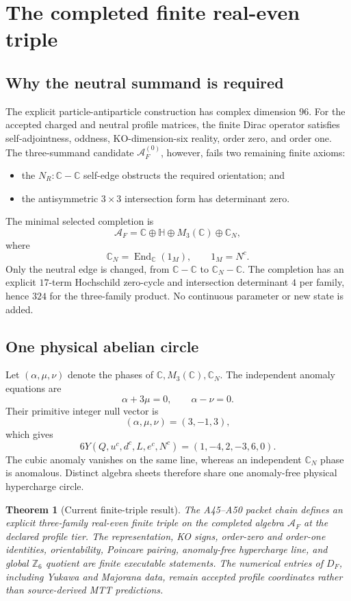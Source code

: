 \documentclass[11pt,a4paper,twoside]{article}
\theoremstyle{plain}
\newtheorem{theorem}{Theorem}[section]
\theoremstyle{definition}
\theoremstyle{remark}
\newcommand{\CC}{\mathbb{C}}
\newcommand{\HH}{\mathbb{H}}
\newcommand{\AF}{\mathcal{A}_{F}}
\newcommand{\DF}{D_{F}}
\newcommand{\CN}{\mathbb{C}_{N}}
\begin{document}
\section{The completed finite real-even triple}

\subsection{Why the neutral summand is required}

The explicit particle-antiparticle construction has complex dimension $96$.
For the accepted charged and neutral profile matrices, the finite Dirac
operator satisfies self-adjointness, oddness, KO-dimension-six reality,
order zero, and order one.  The three-summand candidate
$\AF^{(0)}$, however, fails two remaining finite axioms:
\begin{itemize}
\item the $N_R:\CC\!-\!\CC$ self-edge obstructs the required orientation; and
\item the antisymmetric $3\times3$ intersection form has determinant zero.
\end{itemize}

The minimal selected completion is
\[
 \AF=\CC\oplus\HH\oplus M_3(\CC)\oplus\CN,
\]
where
\[
 \CN=\operatorname{End}_{\CC}(1_M),\qquad 1_M=N^c.
\]
Only the neutral edge is changed, from $\CC\!-\!\CC$ to
$\CN\!-\!\CC$.  The completion has an explicit $17$-term Hochschild
zero-cycle and intersection determinant $4$ per family, hence $324$ for the
three-family product.  No continuous parameter or new state is added.

\subsection{One physical abelian circle}

Let $(\alpha,\mu,\nu)$ denote the phases of
$\CC,M_3(\CC),\CN$.  The independent anomaly equations are
\[
 \alpha+3\mu=0,\qquad \alpha-\nu=0.
\]
Their primitive integer null vector is
\[
 (\alpha,\mu,\nu)=(3,-1,3),
\]
which gives
\[
 6Y(Q,u^c,d^c,L,e^c,N^c)
   =(1,-4,2,-3,6,0).
\]
The cubic anomaly vanishes on the same line, whereas an independent
$\CN$ phase is anomalous.  Distinct algebra sheets therefore share one
anomaly-free physical hypercharge circle.

\begin{theorem}[Current finite-triple result]
\label{thm:finite}
The A45--A50 packet chain defines an explicit three-family real-even finite
triple on the completed algebra $\AF$ at the declared profile tier.  The
representation, KO signs, order-zero and order-one identities,
orientability, Poincare pairing, anomaly-free hypercharge line, and global
$\mathbb{Z}_6$ quotient are finite executable statements.  The numerical
entries of $\DF$, including Yukawa and Majorana data, remain accepted profile
coordinates rather than source-derived MTT predictions.
\end{theorem}
\end{document}
